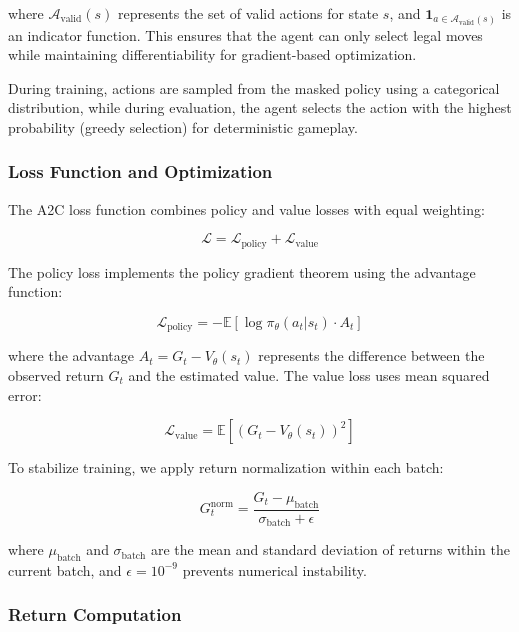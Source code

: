 \documentclass[conference]{IEEEtran}
\begin{document}
where $\mathcal{A}_{\text{valid}}(s)$ represents the set of valid actions for state $s$, and $\mathbf{1}_{a \in \mathcal{A}_{\text{valid}}(s)}$ is an indicator function. This ensures that the agent can only select legal moves while maintaining differentiability for gradient-based optimization.

During training, actions are sampled from the masked policy using a categorical distribution, while during evaluation, the agent selects the action with the highest probability (greedy selection) for deterministic gameplay.

\subsubsection{Loss Function and Optimization}

The A2C loss function combines policy and value losses with equal weighting:

\begin{equation}
\mathcal{L} = \mathcal{L}_{\text{policy}} + \mathcal{L}_{\text{value}}
\end{equation}

The policy loss implements the policy gradient theorem using the advantage function:

\begin{equation}
\mathcal{L}_{\text{policy}} = -\mathbb{E}[\log \pi_{\theta}(a_t|s_t) \cdot A_t]
\end{equation}

where the advantage $A_t = G_t - V_{\theta}(s_t)$ represents the difference between the observed return $G_t$ and the estimated value. The value loss uses mean squared error:

\begin{equation}
\mathcal{L}_{\text{value}} = \mathbb{E}[(G_t - V_{\theta}(s_t))^2]
\end{equation}

To stabilize training, we apply return normalization within each batch:

\begin{equation}
G_t^{\text{norm}} = \frac{G_t - \mu_{\text{batch}}}{\sigma_{\text{batch}} + \epsilon}
\end{equation}

where $\mu_{\text{batch}}$ and $\sigma_{\text{batch}}$ are the mean and standard deviation of returns within the current batch, and $\epsilon = 10^{-9}$ prevents numerical instability.

\subsubsection{Return Computation}
\end{document}
